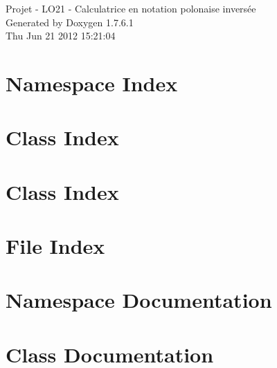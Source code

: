 \documentclass[a4paper]{book}
\begin{document}
\hypersetup{pageanchor=false,citecolor=blue}
\begin{titlepage}
\vspace*{7cm}
\begin{center}
{\Large \-Projet -\/ \-L\-O21 -\/ \-Calculatrice en notation polonaise inversée }\\
\vspace*{1cm}
{\large \-Generated by Doxygen 1.7.6.1}\\
\vspace*{0.5cm}
{\small Thu Jun 21 2012 15:21:04}\\
\end{center}
\end{titlepage}
\clearemptydoublepage
{}
\tableofcontents
\clearemptydoublepage
{}
\hypersetup{pageanchor=true,citecolor=blue}
\chapter{\-Namespace \-Index}

\chapter{\-Class \-Index}

\chapter{\-Class \-Index}

\chapter{\-File \-Index}

\chapter{\-Namespace \-Documentation}


\chapter{\-Class \-Documentation}
























\end{document}
